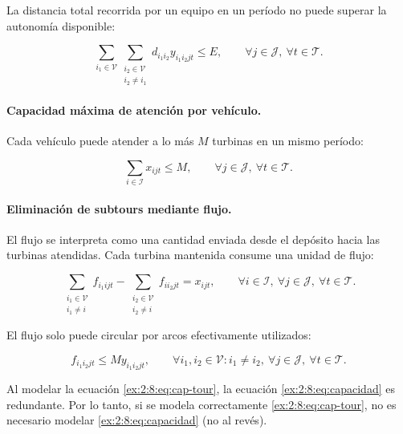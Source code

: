 La distancia total recorrida por un equipo en un período no puede superar la autonomía disponible:

\begin{equation}
\sum_{i_1\in\mathcal{V}}
\sum_{\substack{i_2\in\mathcal{V}\\ i_2\neq i_1}}
d_{i_1 i_2}y_{i_1 i_2 jt}
\leq
E,
\qquad \forall j\in\mathcal{J},\ \forall t\in\mathcal{T}.
\end{equation}

\paragraph{Capacidad máxima de atención por vehículo.}

Cada vehículo puede atender a lo más $M$ turbinas en un mismo período:

\begin{equation}
\sum_{i\in\mathcal{I}}
x_{ijt}
\leq
M,
\qquad \forall j\in\mathcal{J},\ \forall t\in\mathcal{T}.
\label{ex:2:8:eq:capacidad}
\end{equation}

\paragraph{Eliminación de subtours mediante flujo.}

El flujo se interpreta como una cantidad enviada desde el depósito hacia las turbinas atendidas.
Cada turbina mantenida consume una unidad de flujo:

\begin{equation}
\sum_{\substack{i_1\in\mathcal{V}\\ i_1\neq i}}
f_{i_1 ijt}
-
\sum_{\substack{i_2\in\mathcal{V}\\ i_2\neq i}}
f_{i i_2 jt}
=
x_{ijt},
\qquad \forall i\in\mathcal{I},\ \forall j\in\mathcal{J},\ \forall t\in\mathcal{T}.
\end{equation}

El flujo solo puede circular por arcos efectivamente utilizados:

\begin{equation}
f_{i_1 i_2 jt}
\leq
M y_{i_1 i_2 jt},
\qquad 
\forall i_1,i_2\in\mathcal{V}: i_1\neq i_2,\ 
\forall j\in\mathcal{J},\ \forall t\in\mathcal{T}.
\label{ex:2:8:eq:cap-tour}
\end{equation}

Al modelar la ecuación \eqref{ex:2:8:eq:cap-tour}, la ecuación \eqref{ex:2:8:eq:capacidad} es redundante. Por lo tanto, si se modela correctamente \eqref{ex:2:8:eq:cap-tour}, no es necesario modelar \eqref{ex:2:8:eq:capacidad} (no al revés).

